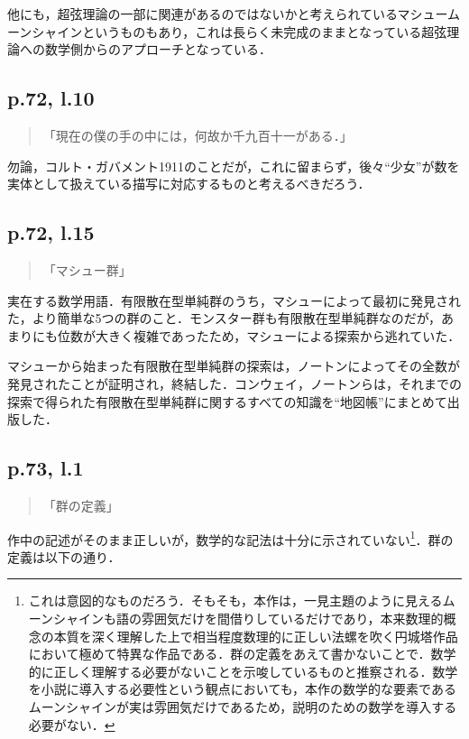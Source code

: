 \documentclass[10pt, a5paper, twoside]{jsarticle}
\theoremstyle{definition}
\begin{document}
			他にも，超弦理論の一部に関連があるのではないかと考えられているマシュームーンシャインというものもあり，これは長らく未完成のままとなっている超弦理論への数学側からのアプローチとなっている．

		\subsection{p.72, l.10}

			\begin{quote}

				「現在の僕の手の中には，何故か千九百十一がある．」
				
			\end{quote}

			勿論，コルト・ガバメント1911のことだが，これに留まらず，後々“少女”が数を実体として扱えている描写に対応するものと考えるべきだろう．

		\subsection{p.72, l.15}

			\begin{quote}

				「マシュー群」
				
			\end{quote}

			実在する数学用語．有限散在型単純群のうち，マシューによって最初に発見された，より簡単な5つの群のこと．モンスター群も有限散在型単純群なのだが，あまりにも位数が大きく複雑であったため，マシューによる探索から逃れていた．

			マシューから始まった有限散在型単純群の探索は，ノートンによってその全数が発見されたことが証明され，終結した．コンウェイ，ノートンらは，それまでの探索で得られた有限散在型単純群に関するすべての知識を“地図帳”\cite{atlas}にまとめて出版した．

		\subsection{p.73, l.1}

			\begin{quote}
				
				「群の定義」

			\end{quote}

			作中の記述がそのまま正しいが，数学的な記法は十分に示されていない\footnote{これは意図的なものだろう．そもそも，本作は，一見主題のように見えるムーンシャインも語の雰囲気だけを間借りしているだけであり，本来数理的概念の本質を深く理解した上で相当程度数理的に正しい法螺を吹く円城塔作品において極めて特異な作品である．群の定義をあえて書かないことで．数学的に正しく理解する必要がないことを示唆しているものと推察される．数学を小説に導入する必要性という観点においても，本作の数学的な要素であるムーンシャインが実は雰囲気だけであるため，説明のための数学を導入する必要がない．}．群の定義は以下の通り\cite{yke}．
\end{document}

